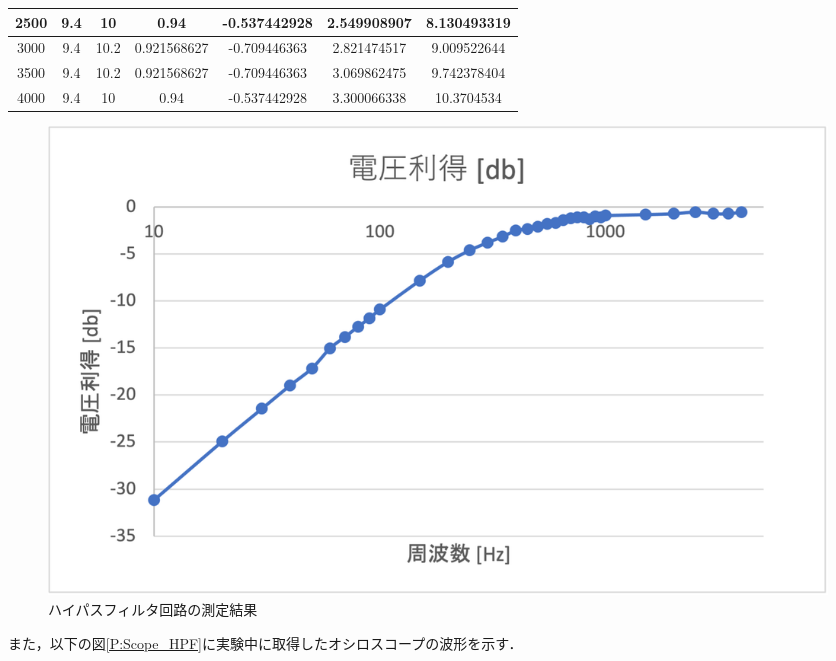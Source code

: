 \documentclass[a4paper,11pt]{jsarticle}
\begin{document}
\begin{center}
\begin{longtable}{|c|c|c|c|c|c|c|}
    2500                & 9.4       & 10       & 0.94        & -0.537442928 & 2.549908907 & 8.130493319  \\ \hline
    3000                & 9.4       & 10.2     & 0.921568627 & -0.709446363 & 2.821474517 & 9.009522644  \\ \hline
    3500                & 9.4       & 10.2     & 0.921568627 & -0.709446363 & 3.069862475 & 9.742378404  \\ \hline
    4000                & 9.4       & 10       & 0.94        & -0.537442928 & 3.300066338 & 10.3704534   \\ \hline
  \end{longtable}
\end{center}

\begin{figure}[H]
  \centering
  \includegraphics[width=0.8\linewidth]{picture/G_HPF_db.png}
  \caption{ハイパスフィルタ回路の測定結果}
  \label{G:HPF_result}
\end{figure}
また，以下の図\ref{P:Scope_HPF}に実験中に取得したオシロスコープの波形を示す．
\end{document}
